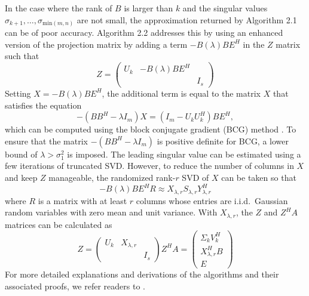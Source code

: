 In the case where the rank of $B$ is larger than $k$ and the singular values $\sigma_{k+1},\dots,\sigma_{\text{min}(m,n)}$ are not small, the approximation returned by Algorithm 2.1 can be of poor accuracy.
Algorithm 2.2 addresses this by using an enhanced version of the projection matrix by adding a term $-B(\lambda) B E^H$ in the $Z$ matrix such that
\begin{equation}
  Z = \begin{pmatrix}
    U_k & -B(\lambda) B E^H & \\
    & & I_s
  \end{pmatrix}
\end{equation}
Setting $X = -B(\lambda) B E^H$, the additional term is equal to the matrix $X$ that satisfies the equation
\begin{equation}
    -(B B^H - \lambda I_m) X = (I_m - U_k U_k^H) B E^H,
    \label{eq:bcg}
\end{equation}
which can be computed using the block conjugate gradient (BCG) method \cite{OLeary1980}.
To ensure that the matrix $-(B B^H - \lambda I_m)$ is positive definite for BCG, a lower bound of $\lambda > \sigma_1^2$ is imposed.
The leading singular value can be estimated using a few iterations of truncated SVD.
However, to reduce the number of columns in $X$ and keep $Z$ manageable, the randomized rank-$r$ SVD of $X$ can be taken so that
\begin{equation}
    -B(\lambda) B E^H R \approx X_{\lambda,r} S_{\lambda,r} Y_{\lambda,r}^H
    \label{eq:bcg_rsvd}
\end{equation}
where $R$ is a matrix with at least $r$ columns whose entries are i.i.d.\ Gaussian random variables with zero mean and unit variance.
With $X_{\lambda,r}$, the $Z$ and $Z^H A$ matrices can be calculated as
\begin{subequations}
\begin{equation}
  Z = \begin{pmatrix}
    U_k & X_{\lambda,r} & \\
    & & I_s
  \end{pmatrix}
  \label{eq:enhanced_Z}
\end{equation}
\begin{equation}
  Z^H A =
  \begin{pmatrix}
    \Sigma_k V_k^H \\
    X_{\lambda,r}^H B \\
    E
  \end{pmatrix}
  \label{eq:enhanced_ZHA}
\end{equation}
\label{eq:enhanced_matrices}
\end{subequations}
For more detailed explanations and derivations of the algorithms and their associated proofs, we refer readers to \cite{Kalantzis2021}.

